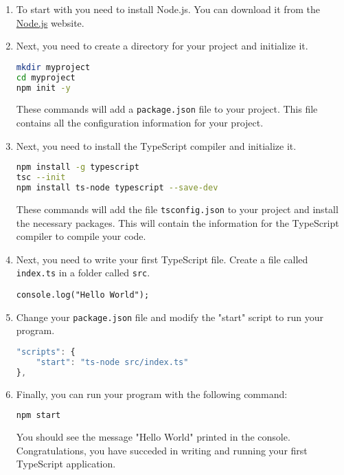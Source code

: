 \documentclass[12pt,a5paper]{book}
\begin{document}
\begin{enumerate}

\item 
To start with you need to install Node.js. You can download it from the
\href{https://nodejs.org}{Node.js} website.

\item Next, you need to create a directory for your project and initialize it.

\begin{lstlisting}[language=bash]
mkdir myproject
cd myproject
npm init -y
\end{lstlisting}

These commands will add a \texttt{package.json} file to your project. This file
contains all the configuration information for your project.

\item Next, you need to install the TypeScript compiler and initialize it.

\begin{lstlisting}[language=bash]
npm install -g typescript
tsc --init
npm install ts-node typescript --save-dev
\end{lstlisting}

These commands will add the file \texttt{tsconfig.json} to your project and
install the necessary packages. This will contain the information for the
TypeScript compiler to compile your code.

\item Next, you need to write your first TypeScript file. Create a file called
\texttt{index.ts} in a folder called \texttt{src}.

\begin{lstlisting}
console.log("Hello World");
\end{lstlisting}

\item Change your \texttt{package.json} file and modify the "start" script to run your program.

\begin{lstlisting}[language=JavaScript]
"scripts": {
    "start": "ts-node src/index.ts"
},
\end{lstlisting}

\item Finally, you can run your program with the following command:

\begin{lstlisting}[language=bash]
npm start
\end{lstlisting}

You should see the message "Hello World" printed in the console.
Congratulations, you have succeded in writing and running your first TypeScript
application.

\end{enumerate}
\end{document}
